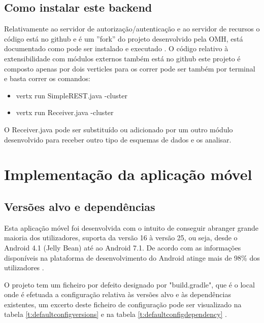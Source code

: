 \subsection{Como instalar este backend}
Relativamente ao servidor de autorização/autenticação e ao servidor de recursos o código está no github \cite{omh-code} e é um ''fork'' do projeto desenvolvido pela \gls{OMH}, está documentado como pode ser instalado e executado \cite{omh-runnatively}.
O código relativo à extensibilidade com módulos externos também está no github\cite{restpubsub} este projeto é composto apenas por dois verticles para os correr pode ser também por terminal e basta correr os comandos:
\begin{itemize}
    \item vertx run SimpleREST.java -cluster
    \item vertx run Receiver.java -cluster
\end{itemize}
O Receiver.java pode ser substituído ou adicionado por um outro módulo desenvolvido para receber outro tipo de esquemas de dados e os analisar.

\section{Implementação da aplicação móvel}
\subsection{Versões alvo e dependências}
Esta aplicação móvel foi desenvolvida com o intuito de conseguir abranger grande maioria dos utilizadores, suporta da versão 16 à versão 25, ou seja,  desde o Android 4.1 (Jelly Bean) até ao Android 7.1. De acordo com as informações disponíveis na plataforma de desenvolvimento do Android atinge mais de 98\% dos utilizadores \cite{android-versions}.

O projeto tem um ficheiro por defeito designado por "build.gradle", que é o local onde é efetuada a configuração relativa às versões alvo e às dependências existentes, um excerto deste ficheiro de configuração pode ser visualizado na tabela \ref{t:defaultconfigversions} e na tabela \ref{t:defaultconfigdependency} .


